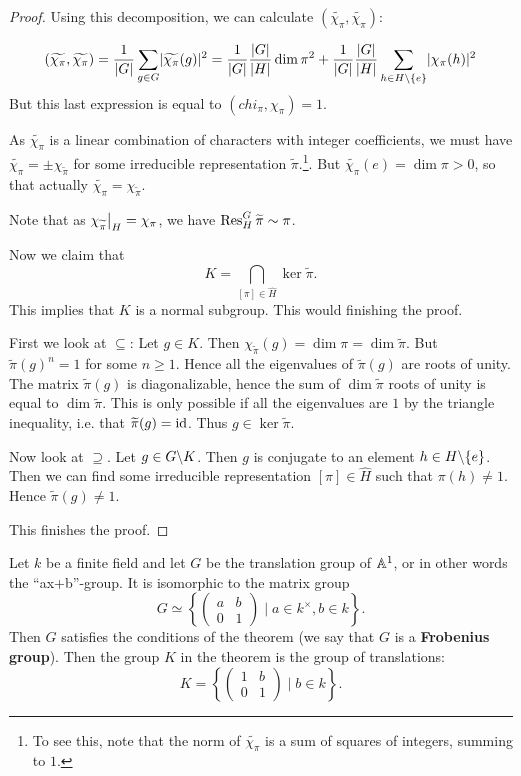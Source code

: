 \documentclass[11pt, english]{article}
\begin{document}
\begin{proof}
Using this decomposition, we can calculate $(\widetilde{\chi_\pi},\widetilde{\chi_\pi})$:

$$
(\widetilde{\chi_\pi},\widetilde{\chi_\pi}) = \frac{1}{\lvert G \rvert} \sum_{g \in G} \lvert \widetilde{\chi_\pi}(g) \rvert^2 = \frac{1}{\lvert G \rvert} \frac{\lvert G \rvert }{\lvert H \rvert } \dim \pi^2 + \frac{1}{\lvert G \rvert} \frac{\lvert G \rvert }{\lvert H \rvert} \sum_{h \in H\backslash \{e\} } \lvert \chi_\pi(h) \rvert^2
$$
But this last expression is equal to $(chi_\pi,\chi_\pi)=1$.

As $\widetilde{\chi_\pi}$ is a linear combination of characters with integer coefficients, we must have $\widetilde{\chi_\pi} = \pm \chi_{\widetilde \pi}$ for some irreducible representation $\widetilde \pi$.\footnote{To see this, note that the norm of $\widetilde{\chi_\pi}$ is a sum of squares of integers, summing to $1$.}. But $\widetilde{\chi_\pi}(e) = \dim \pi > 0$, so that actually $\widetilde{\chi_\pi} = \chi_{\widetilde \pi}$. 

Note that as $\restr{\chi_{\widetilde \pi}}{H} = \chi_\pi$, we have $\operatorname{Res}_H^G \widetilde \pi \sim \pi$.

Now we claim that
$$
K = \bigcap_{[\pi] \in \hat H} \ker \widetilde \pi.
$$
This implies that $K$ is a normal subgroup. This would finishing the proof.

First we look at $\subseteq$: Let $g \in K$. Then $\chi_{\widetilde \pi}(g) = \dim \pi = \dim \widetilde \pi$. But $\widetilde \pi(g)^n = 1$ for some $n \geq 1$. Hence all the eigenvalues of $\widetilde \pi (g)$ are roots of unity. The matrix $\widetilde \pi(g)$ is diagonalizable, hence the sum of $\dim \widetilde \pi$ roots of unity is equal to $\dim \widetilde \pi$. This is only possible if all the eigenvalues are $1$ by the triangle inequality, i.e. that $\widetilde \pi(g)=\text{id}$. Thus $g \in \ker \widetilde \pi$.

Now look at $\supseteq$. Let $g \in G \backslash K$. Then $g$ is conjugate to an element $h \in H \backslash \{e\}$. Then we can find some irreducible representation $[\pi] \in \hat H$ such that $\pi(h) \neq 1$. Hence $\widetilde \pi(g) \neq 1$. 

This finishes the proof.
\end{proof}

\begin{example}
Let $k$ be a finite field and let $G$ be the translation group of $\mathbb{A}^1$, or in other words the ``ax+b''-group. It is isomorphic to the matrix group
$$
G \simeq \left\{ \begin{pmatrix}
a & b \\
0 & 1 
\end{pmatrix} \mid a \in k^\times, b \in k \right\}.
$$
Then $G$ satisfies the conditions of the theorem (we say that $G$ is a \textbf{Frobenius group}). Then the group $K$ in the theorem is the group of translations:
$$
K = \left\{ \begin{pmatrix}
1 & b \\ 0 & 1 
\end{pmatrix}
\mid b \in k \right \}.
$$
\end{example}
\end{document}
